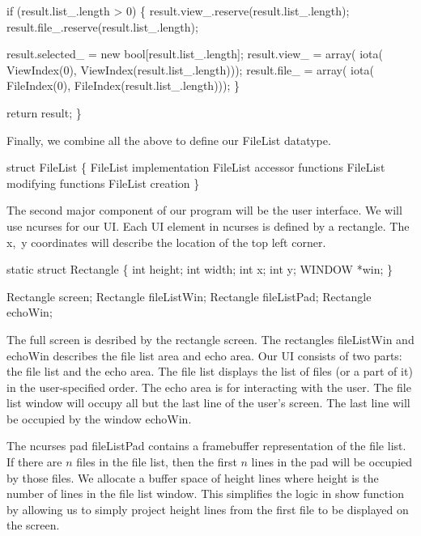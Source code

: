   if (result.list_.length > 0) \{
    result.view_.reserve(result.list_.length);
    result.file_.reserve(result.list_.length);

    result.selected_ = new bool[result.list_.length];
    result.view_     = array(
                        iota(
                         ViewIndex(0),
                         ViewIndex(result.list_.length)));
    result.file_     = array(
                        iota(
                         FileIndex(0),
                         FileIndex(result.list_.length)));
  \}
 
  return result;
\}

\nwendcode{}Finally, we combine all the above to define our {\Tt{}FileList\nwendquote}
datatype.

\nwenddocs{}\endmoddef\nwstartdeflinemarkup\nwenddeflinemarkup
struct FileList
\{
  \LA{}FileList implementation\RA{}
  \LA{}FileList accessor functions\RA{}
  \LA{}FileList modifying functions\RA{}
  \LA{}FileList creation\RA{}
\}

\nwendcode{}The second major component of our program will be the user
interface. We will use ncurses for our UI. Each UI element in ncurses
is defined by a rectangle. The {\Tt{}x,\ y\nwendquote} coordinates will describe the
location of the top left corner.

\nwenddocs{}\endmoddef\nwstartdeflinemarkup\nwenddeflinemarkup
static struct Rectangle \{
  int height;
  int width;
  int x;
  int y;
  WINDOW *win;
\}

Rectangle screen;
Rectangle fileListWin;
Rectangle fileListPad;
Rectangle echoWin;

\nwendcode{}The full screen is desribed by the rectangle {\Tt{}screen\nwendquote}. The
rectangles {\Tt{}fileListWin\nwendquote} and {\Tt{}echoWin\nwendquote} describes the file list
area and echo area. Our UI consists of two parts: the file list and
the echo area. The file list displays the list of files (or a part of
it) in the user-specified order. The echo area is for interacting with
the user. The file list window will occupy all but the last line of
the user's screen. The last line will be occupied by the window
{\Tt{}echoWin\nwendquote}.

The ncurses pad {\Tt{}fileListPad\nwendquote} contains a framebuffer representation
of the file list. If there are $n$ files in the file list, then the
first $n$ lines in the pad will be occupied by those files. We
allocate a buffer space of {\Tt{}height\nwendquote} lines where {\Tt{}height\nwendquote} is the
number of lines in the file list window. This simplifies the logic in
{\Tt{}show\nwendquote} function by allowing us to simply project {\Tt{}height\nwendquote} lines
from the first file to be displayed on the screen.


